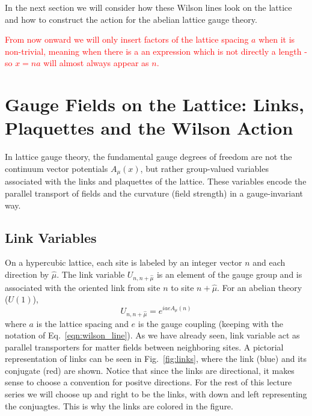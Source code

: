 \documentclass[11pt]{article}
\theoremstyle{definition}
\begin{document}
In the next section we will consider how these Wilson lines look on the lattice and how to construct the action for the abelian lattice gauge theory.

\textcolor{red}{From now onward we will only insert factors of the lattice spacing $a$ when it is non-trivial, meaning when there is a an expression which is not directly a length - so $x = na$ will almost always appear as $n$.}


\section{Gauge Fields on the Lattice: Links, Plaquettes and the Wilson Action}

In lattice gauge theory, the fundamental gauge degrees of freedom are not the continuum vector potentials $A_\mu(x)$, but rather group-valued variables associated with the links and plaquettes of the lattice. These variables encode the parallel transport of fields and the curvature (field strength) in a gauge-invariant way.

\subsection*{Link Variables}
On a hypercubic lattice, each site is labeled by an integer vector $n$ and each direction by $\hat{\mu}$. The link variable $U_{n, n+\hat{\mu}}$ is an element of the gauge group and is associated with the oriented link from site $n$ to site $n+\hat{\mu}$. For an abelian theory ($U(1)$),
\begin{equation}
    U_{n, n+\hat{\mu}} = e^{i a e A_\mu(n)}
\end{equation}
where $a$ is the lattice spacing and $e$ is the gauge coupling (keeping with the notation of Eq.~\eqref{eqn:wilson_line}). As we have already seen, link variable act as parallel transporters for matter fields between neighboring sites. A pictorial representation of links can be seen in Fig.~\ref{fig:links}, where the link (blue) and its conjugate (red) are shown. Notice that since the links are directional, it makes sense to choose a convention for positve directions. For the rest of this lecture series we will choose up and right to be the links, with down and left representing the conjuagtes. This is why the links are colored in the figure. 
\end{document}
